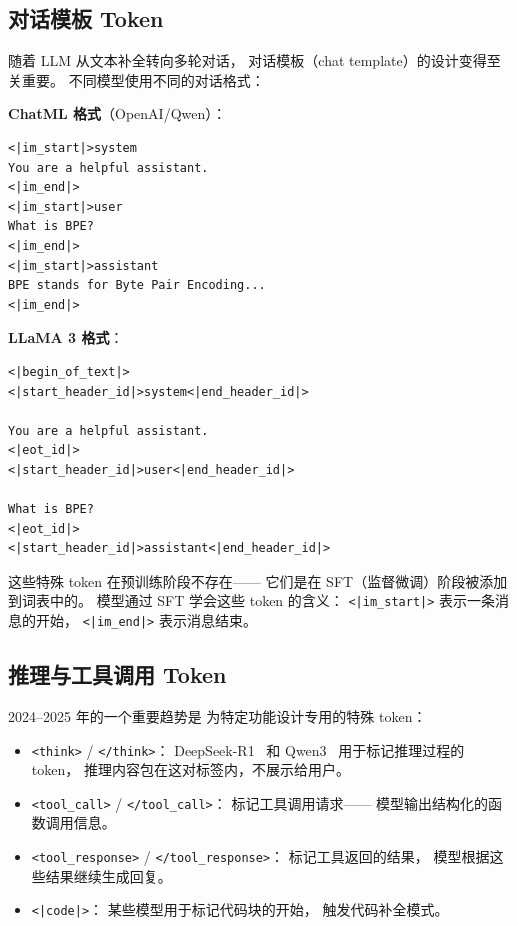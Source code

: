 \subsection{对话模板 Token}

随着 LLM 从文本补全转向多轮对话，
对话模板（chat template）的设计变得至关重要。
不同模型使用不同的对话格式：

\textbf{ChatML 格式}（OpenAI/Qwen）：
\begin{lstlisting}[language={}]
<|im_start|>system
You are a helpful assistant.
<|im_end|>
<|im_start|>user
What is BPE?
<|im_end|>
<|im_start|>assistant
BPE stands for Byte Pair Encoding...
<|im_end|>
\end{lstlisting}

\textbf{LLaMA 3 格式}：
\begin{lstlisting}[language={}]
<|begin_of_text|>
<|start_header_id|>system<|end_header_id|>

You are a helpful assistant.
<|eot_id|>
<|start_header_id|>user<|end_header_id|>

What is BPE?
<|eot_id|>
<|start_header_id|>assistant<|end_header_id|>
\end{lstlisting}

这些特殊 token 在预训练阶段不存在——
它们是在 SFT（监督微调）阶段被添加到词表中的。
模型通过 SFT 学会这些 token 的含义：
\texttt{<|im\_start|>} 表示一条消息的开始，
\texttt{<|im\_end|>} 表示消息结束。

\subsection{推理与工具调用 Token}

2024--2025 年的一个重要趋势是
为特定功能设计专用的特殊 token：

\begin{itemize}[noitemsep]
  \item \texttt{<think>} / \texttt{</think>}：
        DeepSeek-R1~\cite{deepseekr1} 和 Qwen3~\cite{qwen2025qwen3}
        用于标记推理过程的 token，
        推理内容包在这对标签内，不展示给用户。
  \item \texttt{<tool\_call>} / \texttt{</tool\_call>}：
        标记工具调用请求——
        模型输出结构化的函数调用信息。
  \item \texttt{<tool\_response>} / \texttt{</tool\_response>}：
        标记工具返回的结果，
        模型根据这些结果继续生成回复。
  \item \texttt{<|code|>}：
        某些模型用于标记代码块的开始，
        触发代码补全模式。
\end{itemize}

